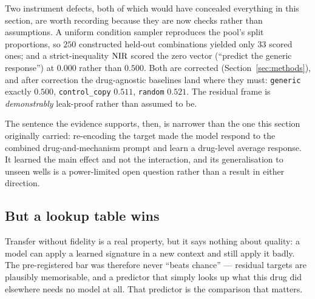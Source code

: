Two instrument defects, both of which would have concealed everything in this section, are worth
recording because they are now checks rather than assumptions. A uniform condition sampler
reproduces the pool's split proportions, so $250$ constructed held-out combinations yielded only
$33$ scored ones; and a strict-inequality $\textrm{NIR}$ scored the zero vector (``predict the generic
response'') at $0.000$ rather than $0.500$. Both are corrected (Section~\ref{sec:methods}), and
after correction the drug-agnostic baselines land where they must: \texttt{generic} exactly
$0.500$, \texttt{control\_copy} $0.511$, \texttt{random} $0.521$. The residual frame is
\emph{demonstrably} leak-proof rather than assumed to be.

The sentence the evidence supports, then, is narrower than the one this section originally carried:
re-encoding the target made the model respond to the combined drug-and-mechanism prompt and learn a
drug-level average response. It learned the main effect and not the interaction, and its
generalisation to unseen wells is a power-limited open question rather than a result in either
direction.

\subsection{But a lookup table wins}
\label{sec:res-lookup}

Transfer without fidelity is a real property, but it says nothing about quality: a model can apply
a learned signature in a new context and still apply it badly. The pre-registered bar was therefore
never ``beats chance'' --- residual targets are plausibly memorisable, and a predictor that simply
looks up what this drug did elsewhere needs no model at all. That predictor is the comparison that
matters.

